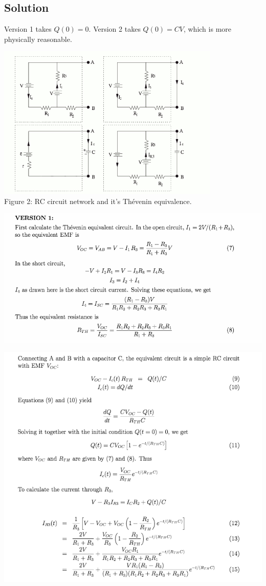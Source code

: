 \documentclass[solutions]{esg8022pset}
\begin{document}
\subsection{Solution}
  Version 1 takes $Q(0) = 0$.  Version 2 takes $Q(0) = CV$, which is more physically reasonable.
  \begin{center}
    \includegraphics[width=0.8\textwidth]{ps07_sol_07_1} \\
    Figure 2: RC circuit network and it's Th\'evenin equivalence.
  \end{center}
  \begin{center}\includegraphics[width=\textwidth]{ps07_sol_07_2}\end{center}
  \begin{center}\includegraphics[width=\textwidth]{ps07_sol_07_3}\end{center}
\end{document}
